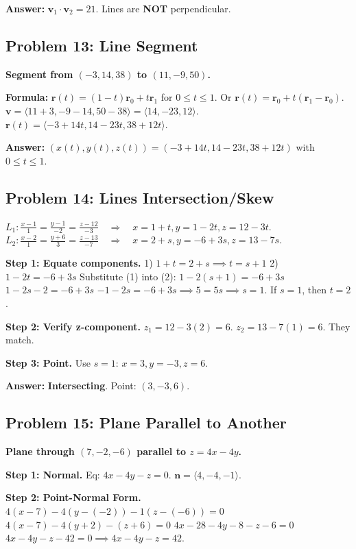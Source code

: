 \documentclass[11pt]{article}
\begin{document}
\textbf{Answer:}
$\mathbf{v}_1 \cdot \mathbf{v}_2 = 21$.
Lines are \textbf{NOT} perpendicular.

\hrulefill

\subsection*{Problem 13: Line Segment}
\textbf{Segment from $(-3, 14, 38)$ to $(11, -9, 50)$.}

\textbf{Formula:} $\mathbf{r}(t) = (1-t)\mathbf{r}_0 + t\mathbf{r}_1$ for $0 \le t \le 1$.
Or $\mathbf{r}(t) = \mathbf{r}_0 + t(\mathbf{r}_1 - \mathbf{r}_0)$.
$\mathbf{v} = \langle 11+3, -9-14, 50-38 \rangle = \langle 14, -23, 12 \rangle$.
$\mathbf{r}(t) = \langle -3+14t, 14-23t, 38+12t \rangle$.

\textbf{Answer:}
$(x(t), y(t), z(t)) = (-3+14t, 14-23t, 38+12t)$ with $0 \le t \le 1$.

\hrulefill

\subsection*{Problem 14: Lines Intersection/Skew}
$L_1: \frac{x-1}{1} = \frac{y-1}{-2} = \frac{z-12}{-3} \quad \Rightarrow \quad x=1+t, y=1-2t, z=12-3t$.
$L_2: \frac{x-2}{1} = \frac{y+6}{3} = \frac{z-13}{-7} \quad \Rightarrow \quad x=2+s, y=-6+3s, z=13-7s$.

\textbf{Step 1: Equate components.}
1) $1+t = 2+s \implies t = s+1$
2) $1-2t = -6+3s$
Substitute (1) into (2):
$1 - 2(s+1) = -6+3s$
$1 - 2s - 2 = -6 + 3s$
$-1 - 2s = -6 + 3s \implies 5 = 5s \implies s=1$.
If $s=1$, then $t=2$.

\textbf{Step 2: Verify z-component.}
$z_1 = 12 - 3(2) = 6$.
$z_2 = 13 - 7(1) = 6$.
They match.

\textbf{Step 3: Point.}
Use $s=1$: $x=3, y=-3, z=6$.

\textbf{Answer:}
\textbf{Intersecting}.
Point: $(3, -3, 6)$.

\hrulefill

\subsection*{Problem 15: Plane Parallel to Another}
\textbf{Plane through $(7, -2, -6)$ parallel to $z = 4x - 4y$.}

\textbf{Step 1: Normal.}
Eq: $4x - 4y - z = 0$. $\mathbf{n} = \langle 4, -4, -1 \rangle$.

\textbf{Step 2: Point-Normal Form.}
$4(x-7) - 4(y-(-2)) - 1(z-(-6)) = 0$
$4(x-7) - 4(y+2) - (z+6) = 0$
$4x - 28 - 4y - 8 - z - 6 = 0$
$4x - 4y - z - 42 = 0 \implies 4x - 4y - z = 42$.
\end{document}
